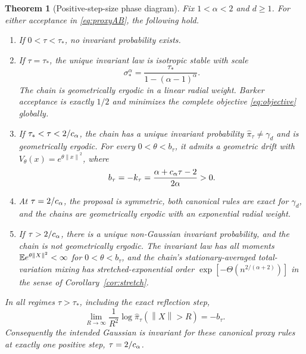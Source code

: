 \documentclass[pdflatex,iicol,sn-mathphys-ay]{sn-jnl}
\newtheorem{theorem}{Theorem}[section]
\theoremstyle{definition}\newtheorem{definition}[theorem]{Definition}
\theoremstyle{remark}\newtheorem{remark}[theorem]{Remark}
\numberwithin{equation}{section}
\newcommand{\norm}[1]{\left\lVert#1\right\rVert}\newcommand{\TV}{\mathrm{TV}}
\newcommand{\1}{\mathbf 1}
\begin{document}
\begin{theorem}[Positive-step-size phase diagram]\label{thm:phase}
Fix $1<\alpha<2$ and $d\ge1$. For either acceptance in \eqref{eq:proxyAB}, the following hold.
\begin{enumerate}[label=(\roman*),leftmargin=2em]
\item If $0<\tau<\tau_*$, no invariant probability exists.
\item If $\tau=\tau_*$, the unique invariant law is isotropic stable with scale
\begin{equation}
\sigma_*^\alpha=\frac{\tau_*}{1-(\alpha-1)^\alpha}.\label{eq:criticalscale}
\end{equation}
The chain is geometrically ergodic in a linear radial weight. Barker acceptance is exactly $1/2$ and minimizes the complete objective \eqref{eq:objective} globally.
\item If $\tau_*<\tau<2/c_\alpha$, the chain has a unique invariant probability $\widehat\pi_\tau\ne\gamma_d$ and is geometrically ergodic. For every $0<\theta<b_\tau$, it admits a geometric drift with $V_\theta(x)=e^{\theta\norm x^2}$, where
\begin{equation}
b_\tau=-k_\tau=\frac{\alpha+c_\alpha\tau-2}{2\alpha}>0.\label{eq:b}
\end{equation}
\item At $\tau=2/c_\alpha$, the proposal is symmetric, both canonical rules are exact for $\gamma_d$, and the chains are geometrically ergodic with an exponential radial weight.
\item If $\tau>2/c_\alpha$, there is a unique non-Gaussian invariant probability, and the chain is not geometrically ergodic. The invariant law has all moments $\E e^{\theta\norm X^2}<\infty$ for $0<\theta<b_\tau$, and the chain's stationary-averaged total-variation mixing has stretched-exponential order $\exp[-\Theta(n^{2/(\alpha+2)})]$ in the sense of Corollary~\ref{cor:stretch}.
\end{enumerate}
In all regimes $\tau>\tau_*$, including the exact reflection step,
\begin{equation}
\lim_{R\to\infty}\frac{1}{R^2}\log\widehat\pi_\tau(\norm X>R)=-b_\tau.\label{eq:tailexponent}
\end{equation}
Consequently the intended Gaussian is invariant for these canonical proxy rules at exactly one positive step, $\tau=2/c_\alpha$.
\end{theorem}
\end{document}
